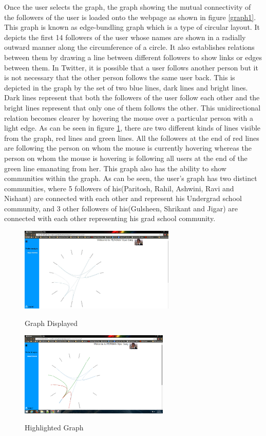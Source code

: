 \documentclass[12pt]{ucthesis}
\newcommand{\captionfonts}{\small\bf\ssp}
\begin{document}
Once the user selects the graph, the graph showing the mutual connectivity of the followers of the user is loaded onto the webpage as shown in figure \ref{graph1}. This graph is known as edge-bundling graph which is a type of circular layout. It depicts the first 14 followers of the user whose names are shown in a radially outward manner along the circumference of a circle. It also establishes relations between them by drawing a line between different followers to show links or edges between them. In Twitter, it is possible that a user follows another person but it is not necessary that the other person follows the same user back. This is depicted in the graph by the set of two blue lines, dark lines and bright lines. Dark lines represent that both the followers of the user follow each other and the bright lines represent that only one of them follows the other. This unidirectional relation becomes clearer by hovering the mouse over a particular person with a light edge. As can be seen in figure \ref{graph_highlighted}, there are two different kinds of lines visible from the graph, red lines and green lines. All the followers at the end of red lines are following the person on whom the mouse is currently hovering whereas the person on whom the mouse is hovering is following all users at the end of the green line emanating from her. This graph also has the ability to show communities within the graph. As can be seen, the user's graph has two distinct communities, where 5 followers of his(Paritosh, Rahil, Ashwini, Ravi and Nishant) are connected with each other and represent his Undergrad school community, and 3 other followers of his(Gulsheen, Shrikant and Jigar) are connected with each other representing his grad school community.\\
\begin{figure}[!htb]
\centering
\begin{minipage}[b]{0.45\linewidth}
\includegraphics[height=40mm]{graph.JPG}
\captionfonts
\caption[Graph Displayed]{Graph Displayed}
\label{graph1}
\end{minipage}%
\begin{minipage}[b]{0.45\linewidth}
\includegraphics[height=40mm]{graph_highlighted.png}
\captionfonts
\caption[Highlighted Graph]{Highlighted Graph}
\label{graph_highlighted}
\end{minipage}
\end{figure}%
\end{document}
